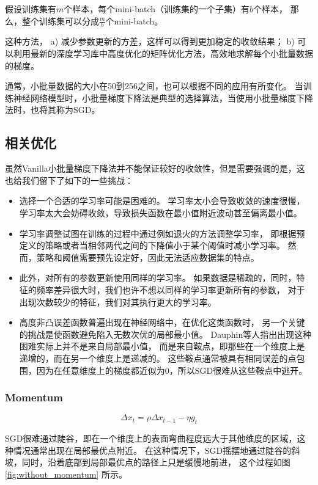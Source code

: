 假设训练集有$m$个样本，每个mini-batch（训练集的一个子集）有$b$个样本，
那么，整个训练集可以分成$\frac{m}{b}$个mini-batch。

这种方法，
a) 减少参数更新的方差，这样可以得到更加稳定的收敛结果；
b) 可以利用最新的深度学习库中高度优化的矩阵优化方法，高效地求解每个小批量数据的梯度。

通常，小批量数据的大小在50到256之间，也可以根据不同的应用有所变化。
当训练神经网络模型时，小批量梯度下降法是典型的选择算法，当使用小批量梯度下降法时，也将其称为SGD。


\subsection{相关优化}
虽然Vanilla小批量梯度下降法并不能保证较好的收敛性，但是需要强调的是，这也给我们留下了如下的一些挑战：
\begin{itemize}
    \item 选择一个合适的学习率可能是困难的。
          学习率太小会导致收敛的速度很慢，学习率太大会妨碍收敛，导致损失函数在最小值附近波动甚至偏离最小值。

    \item 学习率调整试图在训练的过程中通过例如退火的方法调整学习率，
          即根据预定义的策略或者当相邻两代之间的下降值小于某个阈值时减小学习率。
          然而，策略和阈值需要预先设定好，因此无法适应数据集的特点。

    \item 此外，对所有的参数更新使用同样的学习率。
          如果数据是稀疏的，同时，特征的频率差异很大时，我们也许不想以同样的学习率更新所有的参数，
          对于出现次数较少的特征，我们对其执行更大的学习率。

    \item 高度非凸误差函数普遍出现在神经网络中，在优化这类函数时，
          另一个关键的挑战是使函数避免陷入无数次优的局部最小值。
          Dauphin等人指出出现这种困难实际上并不是来自局部最小值，
          而是来自鞍点，即那些在一个维度上是递增的，而在另一个维度上是递减的。
          这些鞍点通常被具有相同误差的点包围，因为在任意维度上的梯度都近似为0，所以SGD很难从这些鞍点中逃开。
\end{itemize}

\subsubsection{Momentum}

\[
    \Delta x_{t} = \rho \Delta x_{t-1} - \eta g_{t}
\]

SGD很难通过陡谷，即在一个维度上的表面弯曲程度远大于其他维度的区域，这种情况通常出现在局部最优点附近。
在这种情况下，SGD摇摆地通过陡谷的斜坡，同时，沿着底部到局部最优点的路径上只是缓慢地前进，
这个过程如图 \ref{fig:without_momentum} 所示。

